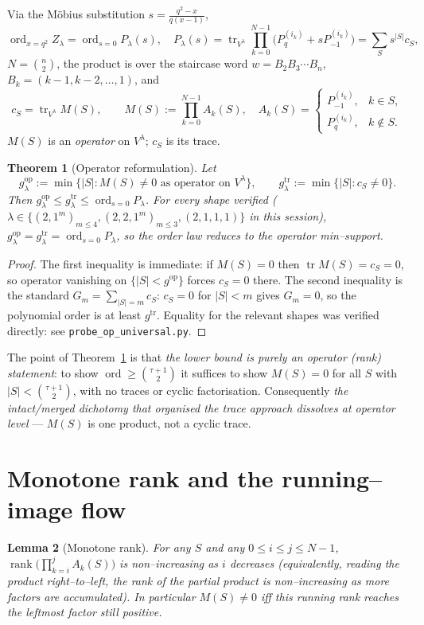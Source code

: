 \documentclass[11pt]{article}
\newtheorem{theorem}{Theorem}
\newtheorem{lemma}[theorem]{Lemma}
\theoremstyle{definition}
\DeclareMathOperator{\tr}{tr}
\DeclareMathOperator{\ord}{ord}
\DeclareMathOperator{\rank}{rank}
\newcommand{\Pq}{P_{q}}
\newcommand{\Pm}{P_{-1}}
\newcommand{\la}{\lambda}
\begin{document}
Via the M\"obius substitution $s=\tfrac{q^2-x}{q(x-1)}$,
\[
\ord_{x=q^2}Z_\la=\ord_{s=0}P_\la(s),\quad
P_\la(s)=\tr_{V^\la}\prod_{k=0}^{N-1}\bigl(\Pq^{(i_k)}+s\Pm^{(i_k)}\bigr)
=\sum_Ss^{|S|}c_S,
\]
$N=\binom n2$, the product is over the staircase word $w=B_2B_3\cdots B_n$,
$B_k=(k{-}1,k{-}2,\dots,1)$, and
\[
c_S=\tr_{V^\la}M(S),\qquad M(S):=\prod_{k=0}^{N-1}A_k(S),\quad
A_k(S)=\begin{cases}\Pm^{(i_k)},&k\in S,\\ \Pq^{(i_k)},&k\notin S.\end{cases}
\]
$M(S)$ is an \emph{operator} on $V^\la$; $c_S$ is its trace.

\begin{theorem}[Operator reformulation]\label{thm:op}
Let
\[
g^{\mathrm{op}}_\la:=\min\{|S|:M(S)\ne0\text{ as operator on }V^\la\},\qquad
g^{\mathrm{tr}}_\la:=\min\{|S|:c_S\ne0\}.
\]
Then $g^{\mathrm{op}}_\la\le g^{\mathrm{tr}}_\la\le\ord_{s=0}P_\la$.
For every shape verified \textup($\la\in\{(2,1^m)_{m\le4},(2,2,1^m)_{m\le3},(2,1,1,1)\}$
in this session\textup), $g^{\mathrm{op}}_\la=g^{\mathrm{tr}}_\la=\ord_{s=0}P_\la$, so the
order law reduces to the operator min--support.
\end{theorem}

\begin{proof}
The first inequality is immediate: if $M(S)=0$ then $\tr M(S)=c_S=0$, so
operator vanishing on $\{|S|<g^{\mathrm{op}}\}$ forces $c_S=0$ there. The
second inequality is the standard $G_m=\sum_{|S|=m}c_S$: $c_S=0$ for $|S|<m$
gives $G_m=0$, so the polynomial order is at least $g^{\mathrm{tr}}$.
Equality for the relevant shapes was verified directly: see
\texttt{probe\_op\_universal.py}.
\end{proof}

The point of Theorem~\ref{thm:op} is that \emph{the lower bound is purely an
operator (rank) statement}: to show $\ord\ge\binom{\tau+1}2$ it suffices to
show $M(S)=0$ for all $S$ with $|S|<\binom{\tau+1}2$, with no traces or cyclic
factorisation. Consequently \emph{the intact/merged dichotomy that organised
the trace approach dissolves at operator level} --- $M(S)$ is one product, not
a cyclic trace.

\section{Monotone rank and the running--image flow}

\begin{lemma}[Monotone rank]\label{lem:monrank}
For any $S$ and any $0\le i\le j\le N-1$, $\rank\bigl(\prod_{k=i}^{j}A_k(S)\bigr)$ is
non--increasing as $i$ decreases (equivalently, reading the product right--to--left,
the rank of the partial product is non--increasing as more factors are accumulated).
In particular $M(S)\ne0$ iff this running rank reaches the leftmost factor still
positive.
\end{lemma}
\end{document}

